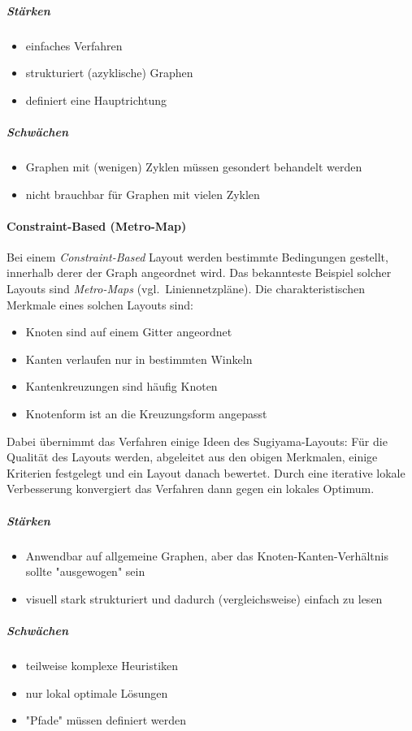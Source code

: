 	\subparagraph{Stärken}
		\begin{itemize}
			\item einfaches Verfahren
			\item strukturiert (azyklische) Graphen
			\item definiert eine Hauptrichtung
		\end{itemize}

		\subparagraph{Schwächen}
			\begin{itemize}
				\item Graphen mit (wenigen) Zyklen müssen gesondert behandelt werden
				\item nicht brauchbar für Graphen mit vielen Zyklen
			\end{itemize}

		\paragraph{Constraint-Based (Metro-Map)}
			Bei einem \emph{Constraint-Based} Layout werden bestimmte Bedingungen gestellt, innerhalb derer der Graph angeordnet wird. Das bekannteste Beispiel solcher Layouts sind \emph{Metro-Maps} (vgl.~Liniennetzpläne). Die charakteristischen Merkmale eines solchen Layouts sind:
			\begin{itemize}
				\item Knoten sind auf einem Gitter angeordnet
				\item Kanten verlaufen nur in bestimmten Winkeln
				\item Kantenkreuzungen sind häufig Knoten
				\item Knotenform ist an die Kreuzungsform angepasst
			\end{itemize}
			Dabei übernimmt das Verfahren einige Ideen des Sugiyama-Layouts: Für die Qualität des Layouts werden, abgeleitet aus den obigen Merkmalen, einige Kriterien festgelegt und ein Layout danach bewertet. Durch eine iterative lokale Verbesserung konvergiert das Verfahren dann gegen ein lokales Optimum.

			\subparagraph{Stärken}
				\begin{itemize}
					\item Anwendbar auf allgemeine Graphen, aber das Knoten-Kanten-Verhältnis sollte "ausgewogen" sein
					\item visuell stark strukturiert und dadurch (vergleichsweise) einfach zu lesen
				\end{itemize}

				\subparagraph{Schwächen}
					\begin{itemize}
						\item teilweise komplexe Heuristiken
						\item nur lokal optimale Lösungen
						\item "Pfade" müssen \ggf definiert werden
					\end{itemize}

